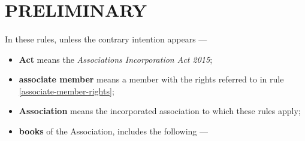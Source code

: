 \documentclass[../constitution.tex]{subfiles}
\begin{document}
\part{PRELIMINARY} \label{part-1---preliminary}

\subsection{} \label{terms-used}

In these rules, unless the contrary intention appears ---

\begin{itemize}[label={-}]
\item \textbf{Act} means the \textit{Associations Incorporation Act 2015};
\item \textbf{associate member} means a member with the rights referred to in rule \ref{associate-member-rights};
\item \textbf{Association} means the incorporated association to which these rules apply;
\item \textbf{books} of the Association, includes the following ---

  \begin{enumerate}
  \def\labelenumi{\alph{enumi})}
  \setcounter{enumi}{0}
  

\end{enumerate}
\end{itemize}
\end{document}
